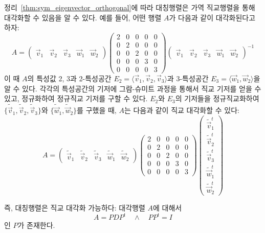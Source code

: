 \documentclass[sections/engineering_mathematics_lecture_note.tex]{subfiles}
\begin{document}
\begin{remark}
    정리~\ref{thm:sym_eigenvector_orthogonal}에 따라 대칭행렬은 가역 직교행렬을 통해 대각화할 수 있음을 알 수 있다.
    예를 들어, 어떤 행렬 $A$가 다음과 같이 대각화된다고 하자:
    \begin{equation*}
        A =
        \begin{pmatrix}
            \vec v_1 & \vec v_2 & \vec v_3 & \vec w_1 & \vec w_2
        \end{pmatrix}
        \begin{pmatrix}
            2 & 0 & 0 & 0 & 0\\
            0 & 2 & 0 & 0 & 0\\
            0 & 0 & 2 & 0 & 0\\
            0 & 0 & 0 & 3 & 0\\
            0 & 0 & 0 & 0 & 3
        \end{pmatrix}
        \begin{pmatrix}
            \vec v_1 & \vec v_2 & \vec v_3 & \vec w_1 & \vec w_2
        \end{pmatrix}^{-1}
    \end{equation*}
    이 때 $A$의 특성값 2, 3과 2-특성공간 $E_2 = \langle \vec v_1, \vec v_2, \vec v_3 \rangle$과 3-특성공간 $E_3 = \langle \vec w_1, \vec w_2\rangle$을 알 수 있다.
    각각의 특성공간의 기저에 그람-슈미트 과정을 통해서 직교 기저를 얻을 수 있고, 정규화하여 정규직교 기저를 구할 수 있다.
    $E_2$와 $E_3$의 기저들을 정규직교화하여 $\{\tilde{\vec v}_1, \tilde{\vec v}_2, \tilde{\vec v}_3\}$와 $\{\tilde{\vec w}_1, \tilde{\vec w}_2\}$를 구했을 때, $A$는 다음과 같이 직교 대각화할 수 있다:
    \begin{equation*}
        A =
        \begin{pmatrix}
            \tilde{\vec{v}}_1 & \tilde{\vec{v}}_2 & \tilde{\vec{v}}_3 & \tilde{\vec{w}}_1 & \tilde{\vec{w}}_2
        \end{pmatrix}
        \begin{pmatrix}
            2 & 0 & 0 & 0 & 0\\
            0 & 2 & 0 & 0 & 0\\
            0 & 0 & 2 & 0 & 0\\
            0 & 0 & 0 & 3 & 0\\
            0 & 0 & 0 & 0 & 3
        \end{pmatrix}
        \begin{pmatrix}
            \tilde{\vec{v}}_1^t \\ \tilde{\vec{v}}_2^t \\ \tilde{\vec{v}}_3^t \\ \tilde{\vec{w}}_1^t \\ \tilde{\vec{w}}_2^t
        \end{pmatrix}
    \end{equation*}
    
    즉, 대칭행렬은 직교 대각화 가능하다:
    대각행렬 $A$에 대해서
    \begin{equation*}
        A = PDP^t \quad \wedge \quad PP^t = I
    \end{equation*}
    인 $P$가 존재한다.
\end{remark}
\end{document}
